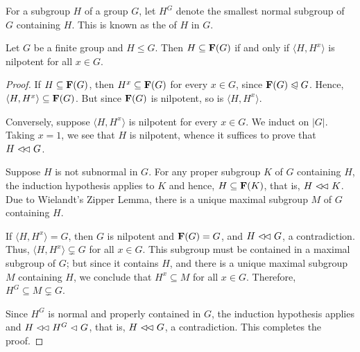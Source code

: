 \begin{definition}
    For a subgroup $H$ of a group $G$, let $H^G$ denote the smallest normal subgroup of $G$ containing $H$. This is known as the  of $H$ in $G$.
\end{definition}

\begin{theorem}[Baer]
    Let $G$ be a finite group and $H\le G$. Then $H\subseteq\mathbf{F}(G)$ if and only if $\langle H, H^x\rangle$ is nilpotent for all $x\in G$.
\end{theorem}
\begin{proof}
    If $H\subseteq\mathbf{F}(G)$, then $H^x\subseteq\mathbf{F}(G)$ for every $x\in G$, since $\mathbf{F}(G)\trianglelefteqslant G$. Hence, $\langle H, H^x\rangle\subseteq\mathbf{F}(G)$. But since $\mathbf{F}(G)$ is nilpotent, so is $\langle H, H^x\rangle$.

    Conversely, suppose $\langle H, H^x\rangle$ is nilpotent for every $x\in G$. We induct on $|G|$. Taking $x = 1$, we see that $H$ is nilpotent, whence it suffices to prove that $H\vartriangleleft\!\vartriangleleft G$. 

    Suppose $H$ is not subnormal in $G$. For any proper subgroup $K$ of $G$ containing $H$, the induction hypothesis applies to $K$ and hence, $H\subseteq\mathbf{F}(K)$, that is, $H\vartriangleleft\!\vartriangleleft K$. Due to Wielandt's Zipper Lemma, there is a unique maximal subgroup $M$ of $G$ containing $H$.

    If $\langle H, H^x\rangle = G$, then $G$ is nilpotent and $\mathbf{F}(G) = G$, and $H\vartriangleleft\!\vartriangleleft G$, a contradiction. Thus, $\langle H, H^x\rangle\subsetneq G$ for all $x\in G$. This subgroup must be contained in a maximal subgroup of $G$; but since it contains $H$, and there is a unique maximal subgroup $M$ containing $H$, we conclude that $H^x\subseteq M$ for all $x\in G$. Therefore, $H^G\subseteq M\subsetneq G$. 

    Since $H^G$ is normal and properly contained in $G$, the induction hypothesis applies and $H\vartriangleleft\!\vartriangleleft H^G\vartriangleleft G$, that is, $H\vartriangleleft\!\vartriangleleft G$, a contradiction. This completes the proof.
\end{proof}


